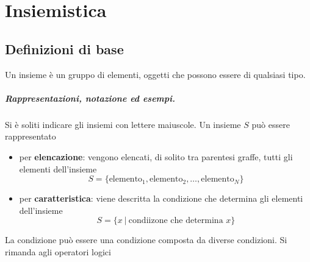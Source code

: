 \chapter{Insiemistica}
\section{Definizioni di base}
\begin{definition}[Insieme] Un insieme è un gruppo di elementi, oggetti che possono essere di qualsiasi tipo.
\end{definition}

\paragraph{Rappresentazioni, notazione ed esempi.}
Si è soliti indicare gli insiemi con lettere maiuscole. Un insieme $S$ può essere rappresentato
\begin{itemize}
    \item per \textbf{elencazione}: vengono elencati, di solito tra parentesi graffe, tutti gli elementi dell'insieme
    \begin{equation}
        S = \{ \text{elemento}_1, \text{elemento}_2, \dots, \text{elemento}_N \}
    \end{equation}
    \item per \textbf{caratteristica}: viene descritta la condizione che determina gli elementi dell'insieme
    \begin{equation}
        S = \{ x \ | \ \text{condiizone che determina $x$} \}
    \end{equation}
\end{itemize}

{\color{red} La condizione può essere una condizione composta da diverse condizioni. Si rimanda agli operatori logici}

